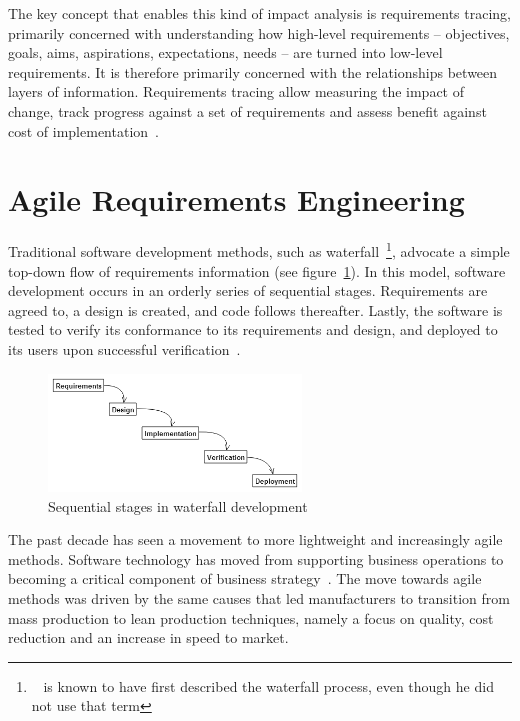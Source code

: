 \documentclass[dissertation,final]{softeng}
\begin{document}
The key concept that enables this kind of impact analysis is requirements tracing, primarily concerned with understanding how high-level requirements -- objectives, goals, aims, aspirations, expectations, needs -- are turned into low-level requirements. It is therefore primarily concerned with the relationships between layers of information. Requirements tracing allow measuring the impact of change, track progress against a set of requirements and assess benefit against cost of implementation~\citep{Hull2011}.

\section{Agile Requirements Engineering}
\label{sec:agile_requirements}
Traditional software development methods, such as waterfall~\footnote{~\citet{royce1970managing} is known to have first described the waterfall process, even though he did not use that term}, advocate a simple top-down flow of requirements information (see figure~\ref{fig:waterfall}). In this model, software development occurs in an orderly series of sequential stages. Requirements are agreed to, a design is created, and code follows thereafter. Lastly, the software is tested to verify its conformance to its requirements and design, and deployed to its users upon successful verification~\citep{Leffingwell2011}.

\begin{figure}[h!]
\includegraphics[width=0.60\textwidth]{waterfall2}
\centering
\caption[Sequential stages in waterfall development]{Sequential stages in waterfall development~\citep{Leffingwell2011}}
\label{fig:waterfall}
\end{figure}

The past decade has seen a movement to more lightweight and increasingly agile methods. Software technology has moved from supporting business operations to becoming a critical component of business strategy~\citep{Highsmith:2000:ASD:323922}. The move towards agile methods was driven by the same causes that led manufacturers to transition from mass production to lean production techniques, namely a focus on quality, cost reduction and an increase in speed to market.
\end{document}
